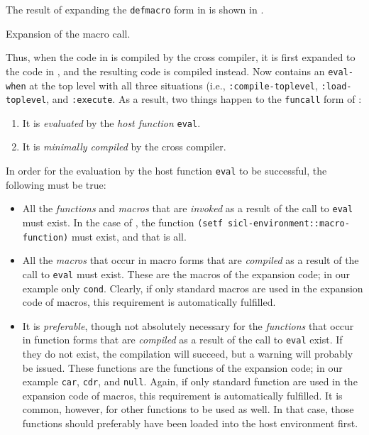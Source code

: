 The result of expanding the \texttt{defmacro} form in
 is shown in
. 

\begin{codefragment}
\caption{\label{code-macro-expansion-and}
Expansion of the macro call.}
\end{codefragment}

Thus, when the code in  is compiled by the
cross compiler, it is first expanded to the code in
, and the resulting code is compiled
instead.  Now  contains an
\texttt{eval-when} at the top level with all three situations (i.e.,
\texttt{:compile-toplevel}, \texttt{:load-toplevel}, and
\texttt{:execute}.  As a result, two things happen to the
\texttt{funcall} form of :

\begin{enumerate}
\item It is \emph{evaluated} by the \emph{host function}
  \texttt{eval}.
\item It is \emph{minimally compiled} by the cross compiler.
\end{enumerate}

In order for the evaluation by the host function \texttt{eval} to be
successful, the following must be true:

\begin{itemize}
\item All the \emph{functions} and \emph{macros} that are
  \emph{invoked} as a result of the call to \texttt{eval} must exist.
  In the case of , the function
  \texttt{(setf sicl-environment::macro-function)} must exist, and that
    is all.
\item All the \emph{macros} that occur in macro forms that are
  \emph{compiled} as a result of the call to \texttt{eval} must
  exist.  These are the macros of the expansion code; in our example
  only \texttt{cond}.  Clearly, if only standard \commonlisp{} macros are
  used in the expansion code of macros, this requirement is
  automatically fulfilled.
\item It is \emph{preferable}, though not absolutely necessary for the
  \emph{functions} that occur in function forms that are
  \emph{compiled} as a result of the call to \texttt{eval} exist.  If
  they do not exist, the compilation will succeed, but a warning will
  probably be issued.  These functions are the functions of the
  expansion code; in our example \texttt{car}, \texttt{cdr}, and
  \texttt{null}.  Again, if only standard \commonlisp{} function are used in
  the expansion code of macros, this requirement is automatically
  fulfilled.  It is common, however, for other functions to be used as
  well.  In that case, those functions should preferably have been
  loaded into the host environment first. 
\end{itemize}


